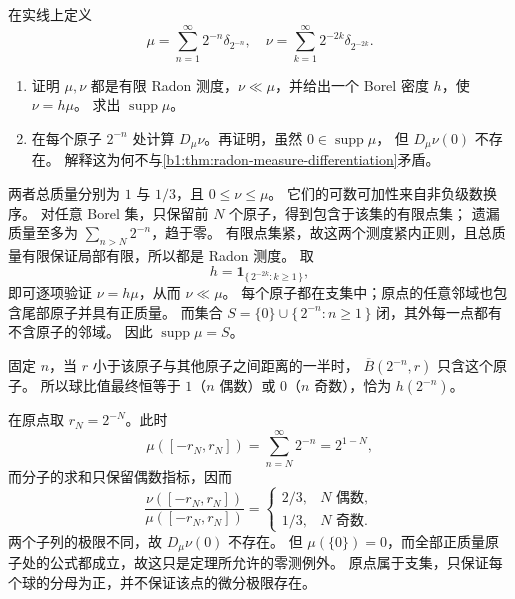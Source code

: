 \begin{exercise}\label{b1:ex:14-accumulating-atoms}
在实线上定义
\[
 \mu=\sum_{n=1}^{\infty}2^{-n}\delta_{2^{-n}},\quad
 \nu=\sum_{k=1}^{\infty}2^{-2k}\delta_{2^{-2k}}.
\]
\begin{enumerate}
\item\label{b1:item:14-atoms-radon}
证明 \(\mu,\nu\) 都是有限 Radon 测度，\(\nu\ll\mu\)，并给出一个 Borel 密度 \(h\)，使 \(\nu=h\mu\)。
求出 \(\operatorname{supp}\mu\)。
\item\label{b1:item:14-atoms-derivative}
在每个原子 \(2^{-n}\) 处计算 \(D_\mu\nu\)。再证明，虽然 \(0\in\operatorname{supp}\mu\)，
但 \(D_\mu\nu(0)\) 不存在。
解释这为何不与\cref{b1:thm:radon-measure-differentiation}矛盾。
\end{enumerate}
\end{exercise}
\begin{solution}
两者总质量分别为 \(1\) 与 \(1/3\)，且 \(0\leq\nu\leq\mu\)。
它们的可数可加性来自非负级数换序。
对任意 Borel 集，只保留前 \(N\) 个原子，得到包含于该集的有限点集；
遗漏质量至多为 \(\sum_{n>N}2^{-n}\)，趋于零。
有限点集紧，故这两个测度紧内正则，且总质量有限保证局部有限，所以都是 Radon 测度。
取
\[
 h=\mathbf1_{\{\,2^{-2k}:k\geq1\,\}},
\]
即可逐项验证 \(\nu=h\mu\)，从而 \(\nu\ll\mu\)。
每个原子都在支集中；原点的任意邻域也包含尾部原子并具有正质量。
而集合 \(S=\{0\}\cup\{\,2^{-n}:n\geq1\,\}\) 闭，其外每一点都有不含原子的邻域。
因此 \(\operatorname{supp}\mu=S\)。

固定 \(n\)，当 \(r\) 小于该原子与其他原子之间距离的一半时，
\(\overline B(2^{-n},r)\) 只含这个原子。
所以球比值最终恒等于 \(1\)（\(n\) 偶数）或 \(0\)（\(n\) 奇数），恰为 \(h(2^{-n})\)。

在原点取 \(r_N=2^{-N}\)。此时
\[
 \mu([-r_N,r_N])=\sum_{n=N}^{\infty}2^{-n}=2^{1-N},
\]
而分子的求和只保留偶数指标，因而
\[
 \frac{\nu([-r_N,r_N])}{\mu([-r_N,r_N])}
 =\begin{cases}
 2/3,&N\text{ 偶数},\\
 1/3,&N\text{ 奇数}.
 \end{cases}
\]
两个子列的极限不同，故 \(D_\mu\nu(0)\) 不存在。
但 \(\mu(\{0\})=0\)，而全部正质量原子处的公式都成立，故这只是定理所允许的零测例外。
原点属于支集，只保证每个球的分母为正，并不保证该点的微分极限存在。
\end{solution}

